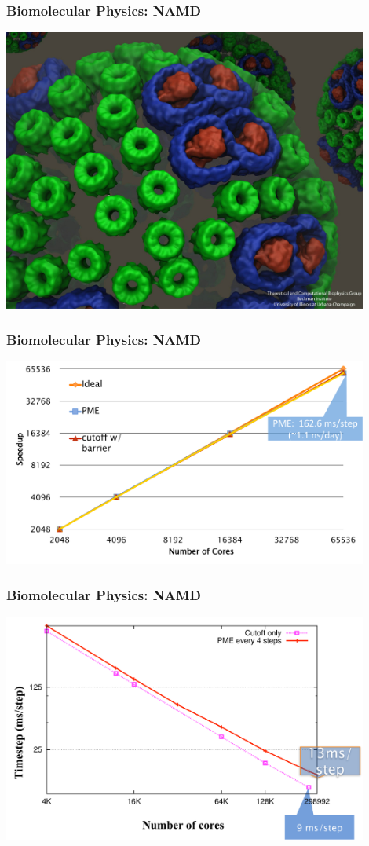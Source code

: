 \begin{frame}
\frametitle{Biomolecular Physics: NAMD}
\includegraphics[width=0.9\textwidth]{../figures/namd/chromatophore-vesicle-2012-01.jpg}
\end{frame}


\begin{frame}
\frametitle{Biomolecular Physics: NAMD}
\includegraphics[width=0.9\textwidth]{../figures/namd_bgp.pdf}
\end{frame}


\begin{frame}
\frametitle{Biomolecular Physics: NAMD}
\includegraphics[width=0.9\textwidth]{../figures/namd_titan.pdf}
\end{frame}


